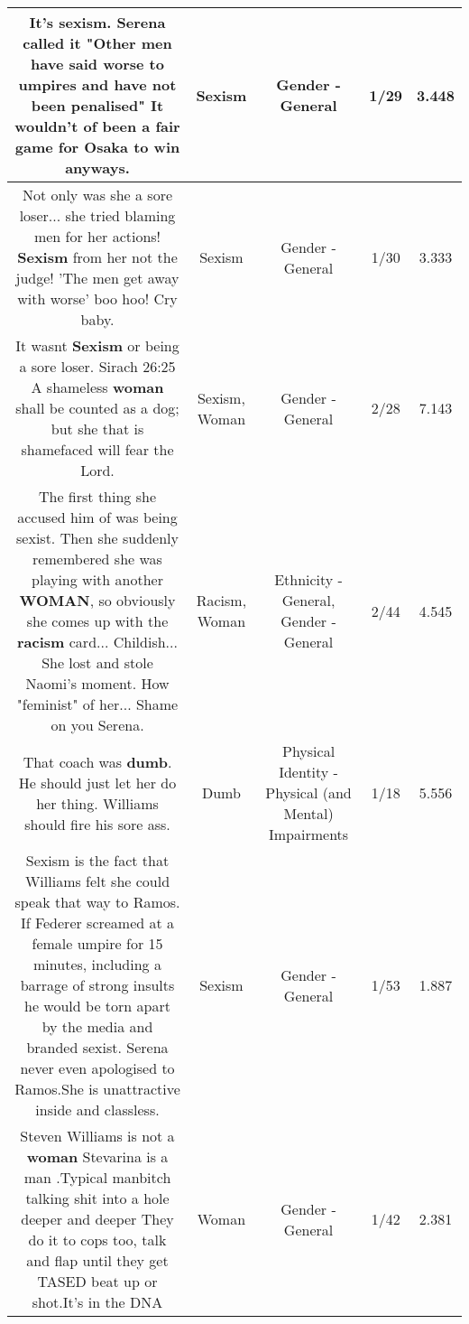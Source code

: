 \documentclass[11pt]{article}
\newlength\mylength
\begin{document}
\begin{center}
\begin{longtable}{|C{.65\mylength}|C{.30\mylength}|C{.12\mylength}|C{.12\mylength}|C{.12\mylength}|}
  \small It's \textbf{sexism}. Serena called it "Other men have said worse to umpires and have not been penalised" It wouldn't of been a fair game for Osaka to win anyways.\normalsize   & Sexism & Gender - General & 1/29 & 3.448 \\  \hline
  \small Not only was she a sore loser... she tried blaming men for her actions! \textbf{Sexism} from her not the judge! 'The men get away with worse' boo hoo! Cry baby.\normalsize   & Sexism & Gender - General & 1/30 & 3.333 \\  \hline
  \small It wasnt \textbf{Sexism} or being a sore loser. Sirach 26:25 A shameless \textbf{woman} shall be counted as a dog; but she that is shamefaced will fear the Lord.\normalsize   & Sexism, Woman & Gender - General & 2/28 & 7.143 \\  \hline
  \small The first thing she accused him of was being sexist. Then she suddenly remembered she was playing with another \textbf{WOMAN}, so obviously she comes up with the \textbf{racism} card... Childish... She lost and stole Naomi's moment. How "feminist" of her... Shame on you Serena.\normalsize   & Racism, Woman & Ethnicity - General, Gender - General & 2/44 & 4.545 \\  \hline
  \small That coach was \textbf{dumb}.  He should just let her do her thing.  Williams should fire his sore ass.\normalsize   & Dumb & Physical Identity - Physical (and Mental) Impairments & 1/18 & 5.556 \\  \hline
  \small Sexism is the fact that Williams felt she could speak that way to Ramos. If Federer screamed at a female umpire for 15 minutes, including a barrage of strong insults he would be torn apart by the media and branded sexist. Serena never even apologised to Ramos.She is unattractive inside and classless.\normalsize   & Sexism & Gender - General & 1/53 & 1.887 \\  \hline
  \small Steven Williams is not a \textbf{woman} Stevarina is a man .Typical manbitch talking shit into a hole deeper and deeper They do it to cops too, talk and flap until they get TASED beat up or shot.It's in the DNA\normalsize   & Woman & Gender - General & 1/42 & 2.381 \\  \hline

\end{longtable}
\end{center}
\end{document}
